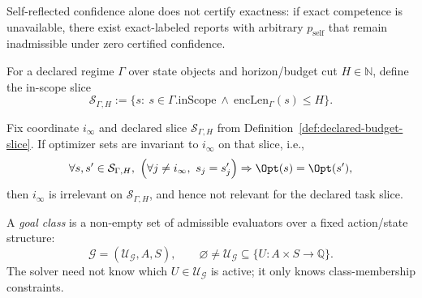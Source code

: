 \begin{proposition}\label{prop:self-confidence-not-certification}
Self-reflected confidence alone does not certify exactness: if exact competence is unavailable, there exist exact-labeled reports with arbitrary $p_{\mathrm{self}}$ that remain inadmissible under zero certified confidence.
\end{proposition}

\begin{definition}\label{def:declared-budget-slice}
For a declared regime $\Gamma$ over state objects and horizon/budget cut $H\in\mathbb{N}$, define the in-scope slice
\[
\mathcal{S}_{\Gamma,H}
:=
\{s:\ s\in\Gamma.\mathrm{inScope}\ \wedge\ \mathrm{encLen}_\Gamma(s)\le H\}.
\]
\end{definition}

\begin{proposition}\label{prop:bounded-slice-meta-irrelevance}
Fix coordinate $i_\infty$ and declared slice $\mathcal{S}_{\Gamma,H}$ from Definition~\ref{def:declared-budget-slice}.
If optimizer sets are invariant to $i_\infty$ on that slice, i.e.,
\[
\forall s,s'\in\mathcal{S}_{\Gamma,H},\ 
\Big(\forall j\neq i_\infty,\ s_j=s'_j\Big)
\Rightarrow
\Opt(s)=\Opt(s'),
\]
then $i_\infty$ is irrelevant on $\mathcal{S}_{\Gamma,H}$, and hence not relevant for the declared task slice.
\leanmeta{\LHrng{CC}{32}{33}.}
\end{proposition}

\begin{definition}\label{def:goal-class}
A \emph{goal class} is a non-empty set of admissible evaluators over a fixed action/state structure:
\[
\mathcal{G}=(\mathcal{U}_{\mathcal{G}},A,S),\qquad
\varnothing\neq\mathcal{U}_{\mathcal{G}}\subseteq\{U:A\times S\to\mathbb{Q}\}.
\]
The solver need not know which $U\in\mathcal{U}_{\mathcal{G}}$ is active; it only knows class-membership constraints.
\leanmeta{\LH{IV1}.}
\end{definition}

